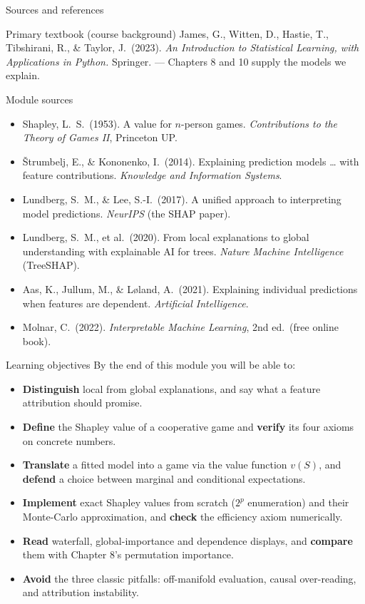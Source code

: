 \documentclass[aspectratio=169,11pt]{beamer}
\begin{document}
\begin{frame}{Sources and references}
  \footnotesize
  \begin{block}{Primary textbook (course background)}
    James, G., Witten, D., Hastie, T., Tibshirani, R., \& Taylor, J.\ (2023).
    \emph{An Introduction to Statistical Learning, with Applications in
    Python.} Springer. --- Chapters 8 and 10 supply the models we explain.
  \end{block}
  \begin{block}{Module sources}
    \begin{itemize}
      \item Shapley, L.\ S.\ (1953). A value for $n$-person games. \emph{Contributions to the Theory of Games II}, Princeton UP.
      \item \v{S}trumbelj, E., \& Kononenko, I.\ (2014). Explaining prediction models \dots{} with feature contributions. \emph{Knowledge and Information Systems}.
      \item Lundberg, S.\ M., \& Lee, S.-I.\ (2017). A unified approach to interpreting model predictions. \emph{NeurIPS} (the SHAP paper).
      \item Lundberg, S.\ M., et al.\ (2020). From local explanations to global understanding with explainable AI for trees. \emph{Nature Machine Intelligence} (TreeSHAP).
      \item Aas, K., Jullum, M., \& L{\o}land, A.\ (2021). Explaining individual predictions when features are dependent. \emph{Artificial Intelligence}.
      \item Molnar, C.\ (2022). \emph{Interpretable Machine Learning}, 2nd ed.\ (free online book).
    \end{itemize}
  \end{block}
\end{frame}

\begin{frame}{Learning objectives}
  By the end of this module you will be able to:
  \begin{itemize}
    \item \textbf{Distinguish} local from global explanations, and say what a
          feature attribution should promise.
    \item \textbf{Define} the Shapley value of a cooperative game and
          \textbf{verify} its four axioms on concrete numbers.
    \item \textbf{Translate} a fitted model into a game via the value function
          $v(S)$, and \textbf{defend} a choice between marginal and conditional
          expectations.
    \item \textbf{Implement} exact Shapley values from scratch ($2^p$
          enumeration) and their Monte-Carlo approximation, and \textbf{check}
          the efficiency axiom numerically.
    \item \textbf{Read} waterfall, global-importance and dependence displays,
          and \textbf{compare} them with Chapter 8's permutation importance.
    \item \textbf{Avoid} the three classic pitfalls: off-manifold evaluation,
          causal over-reading, and attribution instability.
  \end{itemize}
\end{frame}
\end{document}
